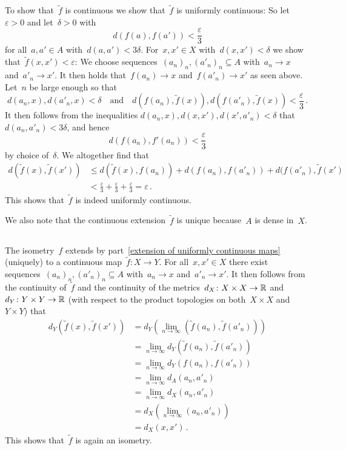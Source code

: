 To show that~$\tilde{f}$ is continuous we show that~$\tilde{f}$ is uniformly continuous:
So let~$\varepsilon > 0$ and let~$\delta > 0$ with
\[
    d(f(a), f(a'))
  < \frac{\varepsilon}{3}
\]
for all~$a, a' \in A$ with~$d(a,a') < 3\delta$.
For~$x, x' \in X$ with~$d(x,x') < \delta$ we show that~$\tilde{f}(x,x') < \varepsilon$:
We choose sequences~$(a_n)_n, (a'_n)_n \subseteq A$ with~$a_n \to x$ and~$a'_n \to x'$.
It then holds that~$f(a_n) \to x$ and~$f(a'_n) \to x'$ as seen above.
Let~$n$ be large enough so that
\[
    d(a_n, x),
    d(a'_n, x)
  < \delta
  \quad\text{and}\quad
    d(f(a_n), \tilde{f}(x)),
    d(f(a'_n), \tilde{f}(x))
  < \frac{\varepsilon}{3} \,.
\]
It then follows from the inequalities $d(a_n, x), d(x, x'), d(x', a'_n) < \delta$ that~$d(a_n, a'_n) < 3 \delta$, and hence
\[
  d(f(a_n), f'(a_n)) < \frac{\varepsilon}{3}
\]
by choice of~$\delta$.
We altogether find that
\begin{align*}
          d(\tilde{f}(x), \tilde{f}(x'))
  &\leq   d(\tilde{f}(x), f(a_n))
          + d(f(a_n), f(a'_n))
          + d(f(a'_n), \tilde{f}(x')  \\
  &<      \frac{\varepsilon}{3}
        + \frac{\varepsilon}{3}
        + \frac{\varepsilon}{3}
  =     \varepsilon \,.
\end{align*}
This shows that~$\tilde{f}$ is indeed uniformly continuous.




We also note that the continuous extension~$\tilde{f}$ is unique because~$A$ is dense in~$X$.





\subsection{}

The isometry~$f$ extends by part~\ref{extension of uniformly continuous maps} (uniquely) to a continuous map~$\tilde{f} \colon X \to Y$.
For all~$x, x' \in X$ there exist sequences~$(a_n)_n, (a'_n)_n \subseteq A$ with~$a_n \to x$ and~$a'_n \to x'$.
It then follows from the continuity of~$\tilde{f}$ and the continuity of the metrics~$d_X \colon X \times X \to \mathbb{R}$ and~$d_Y \colon Y \times Y \to \mathbb{R}$ (with respect to the product topologies on both~$X \times X$ and~$Y \times Y$) that
\begin{align*}
      d_Y(\tilde{f}(x), \tilde{f}(x'))
  &=  d_Y\left( \lim_{n \to \infty} (\tilde{f}(a_n), \tilde{f}(a'_n)) \right) \\
  &=  \lim_{n \to \infty} d_Y(\tilde{f}(a_n), \tilde{f}(a'_n))  \\
  &=  \lim_{n \to \infty} d_Y(f(a_n), f(a'_n))  \\
  &=  \lim_{n \to \infty} d_A(a_n, a'_n)  \\
  &=  \lim_{n \to \infty} d_X(a_n, a'_n)  \\
  &=  d_X\left( \lim_{n \to \infty} (a_n, a'_n) \right) \\
  &=  d_X(x, x') \,.
\end{align*}
This shows that~$\tilde{f}$ is again an isometry.

